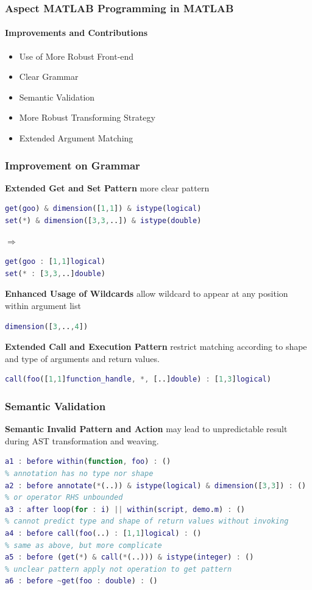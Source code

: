 \documentclass[10pt]{beamer}
\begin{document}
\begin{frame}
\frametitle{Aspect MATLAB Programming in MATLAB}
\framesubtitle{Improvements and Contributions}
\begin{itemize}
    \item Use of More Robust Front-end
    \item Clear Grammar
    \item Semantic Validation
    \item More Robust Transforming Strategy
    \item Extended Argument Matching
\end{itemize}
\end{frame}

\begin{frame}[fragile]
\frametitle{Improvement on Grammar}
\textbf{Extended Get and Set Pattern} more clear pattern
\begin{lstlisting}[basicstyle=\small, language=MATLAB]
get(goo) & dimension([1,1]) & istype(logical)
set(*) & dimension([3,3,..]) & istype(double)
\end{lstlisting}
$\Rightarrow$
\begin{lstlisting}[basicstyle=\small, language=MATLAB]
get(goo : [1,1]logical)
set(* : [3,3,..]double)
\end{lstlisting}

\textbf{Enhanced Usage of Wildcards} allow wildcard to appear at any position
within argument list
\begin{lstlisting}[basicstyle=\small, language=MATLAB]
dimension([3,..,4])
\end{lstlisting}

\textbf{Extended Call and Execution Pattern} restrict matching according to
shape and type of arguments and return values.
\begin{lstlisting}[basicstyle=\small, language=MATLAB]
call(foo([1,1]function_handle, *, [..]double) : [1,3]logical)
\end{lstlisting}
\end{frame}

\begin{frame}[fragile]
\frametitle{Semantic Validation}
\textbf{Semantic Invalid Pattern and Action} may lead to unpredictable result
during AST transformation and weaving.
\begin{lstlisting}[basicstyle=\small, language=MATLAB]
% unbounded 'within pattern'
a1 : before within(function, foo) : ()
% annotation has no type nor shape
a2 : before annotate(*(..)) & istype(logical) & dimension([3,3]) : ()
% or operator RHS unbounded
a3 : after loop(for : i) || within(script, demo.m) : ()
% cannot predict type and shape of return values without invoking
a4 : before call(foo(..) : [1,1]logical) : ()
% same as above, but more complicate
a5 : before (get(*) & call(*(..))) & istype(integer) : ()
% unclear pattern apply not operation to get pattern
a6 : before ~get(foo : double) : ()
\end{lstlisting}
\end{frame}
\end{document}
